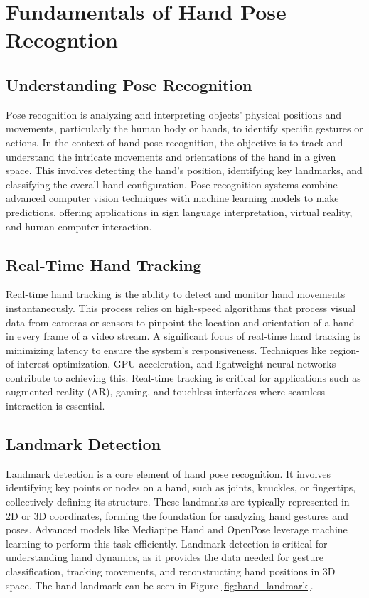 \chapter{Fundamentals of Hand Pose Recogntion}

\section{Understanding Pose Recognition}
Pose recognition is analyzing and interpreting objects' physical positions and movements, particularly the human body or hands, to identify specific gestures or actions. In the context of hand pose recognition, the objective is to track and understand the intricate movements and orientations of the hand in a given space. This involves detecting the hand's position, identifying key landmarks, and classifying the overall hand configuration. Pose recognition systems combine advanced computer vision techniques with machine learning models to make predictions, offering applications in sign language interpretation, virtual reality, and human-computer interaction.
\section{Real-Time Hand Tracking}
Real-time hand tracking is the ability to detect and monitor hand movements instantaneously. This process relies on high-speed algorithms that process visual data from cameras or sensors to pinpoint the location and orientation of a hand in every frame of a video stream. A significant focus of real-time hand tracking is minimizing latency to ensure the system's responsiveness. Techniques like region-of-interest optimization, GPU acceleration, and lightweight neural networks contribute to achieving this. Real-time tracking is critical for applications such as augmented reality (AR), gaming, and touchless interfaces where seamless interaction is essential.
\section{Landmark Detection}
Landmark detection is a core element of hand pose recognition. It involves identifying key points or nodes on a hand, such as joints, knuckles, or fingertips, collectively defining its structure. These landmarks are typically represented in 2D or 3D coordinates, forming the foundation for analyzing hand gestures and poses. Advanced models like Mediapipe Hand and OpenPose leverage machine learning to perform this task efficiently. Landmark detection is critical for understanding hand dynamics, as it provides the data needed for gesture classification, tracking movements, and reconstructing hand positions in 3D space. The hand landmark can be seen in Figure \ref{fig:hand_landmark}.

